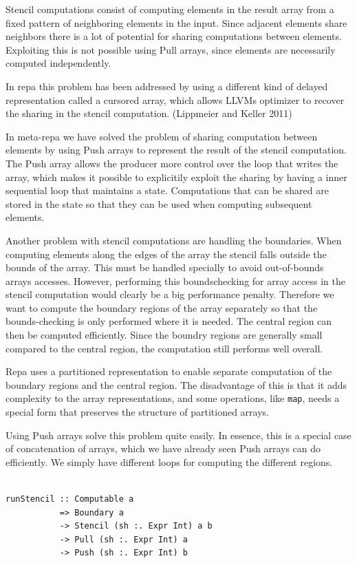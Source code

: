 \documentclass[preprint]{sigplanconf}
\begin{document}
Stencil computations consist of computing elements in the result array
from a fixed pattern of neighboring elements in the input. Since
adjacent elements share neighbors there is a lot of potential for
sharing computations between elements. Exploiting this is not possible
using Pull arrays, since elements are necessarily computed
independently.

In repa this problem has been addressed by using a different kind of
delayed representation called a cursored array, which allows LLVMs
optimizer to recover the sharing in the stencil computation. (Lippmeier
and Keller 2011)

In meta-repa we have solved the problem of sharing computation between
elements by using Push arrays to represent the result of the stencil
computation. The Push array allows the producer more control over the
loop that writes the array, which makes it possible to explicitily
exploit the sharing by having a inner sequential loop that maintains a
state. Computations that can be shared are stored in the state so that
they can be used when computing subsequent elements.

Another problem with stencil computations are handling the boundaries.
When computing elements along the edges of the array the stencil falls
outside the bounds of the array. This must be handled specially to avoid
out-of-bounds arrays accesses. However, performing this boundschecking
for array access in the stencil computation would clearly be a big
performance penalty. Therefore we want to compute the boundary regions
of the array separately so that the bounds-checking is only performed
where it is needed. The central region can then be computed efficiently.
Since the boundry regions are generally small compared to the central
region, the computation still performs well overall.

Repa uses a partitioned representation to enable separate computation of
the boundary regions and the central region. The disadvantage of this is
that it adds complexity to the array representations, and some
operations, like \texttt{map}, needs a special form that preserves the
structure of partitioned arrays.

Using Push arrays solve this problem quite easily. In essence, this is a
special case of concatenation of arrays, which we have already seen Push
arrays can do efficiently. We simply have different loops for computing
the different regions.

\begin{verbatim}

runStencil :: Computable a
           => Boundary a
           -> Stencil (sh :. Expr Int) a b
           -> Pull (sh :. Expr Int) a
           -> Push (sh :. Expr Int) b
\end{verbatim}
\end{document}
